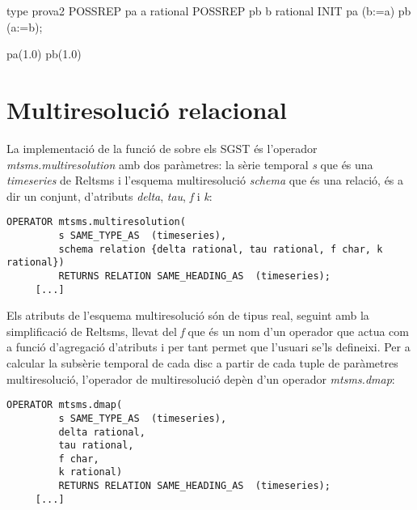 
type prova2 
  POSSREP pa {a rational}
  POSSREP pb {b rational}
  INIT pa (b:=a)
         pb (a:=b);

pa(1.0)
pb(1.0)







\section{Multiresolució relacional}


La implementació de la funció de 
sobre els \gls{SGST} és l'operador \emph{mtsms.multiresolution} amb
dos paràmetres: la sèrie temporal \emph{s} que és una
\emph{timeseries} de Reltsms i l'esquema multiresolució \emph{schema}
que és una relació, és a dir un conjunt, d'atributs \emph{delta},
\emph{tau}, \emph{f} i \emph{k}:

\begin{lstlisting}[style=tutorialD]
OPERATOR mtsms.multiresolution(
         s SAME_TYPE_AS  (timeseries),   
         schema relation {delta rational, tau rational, f char, k rational}) 
         RETURNS RELATION SAME_HEADING_AS  (timeseries);
     [...]
\end{lstlisting}
       



Els atributs de l'esquema multiresolució són de tipus real, seguint
amb la simplificació de Reltsms, llevat del \emph{f} que és un nom
d'un operador que actua com a funció d'agregació d'atributs i per tant
permet que l'usuari se'ls defineixi. Per a calcular la subsèrie
temporal de cada disc a partir de cada tuple de paràmetres
multiresolució, l'operador de multiresolució depèn d'un operador
\emph{mtsms.dmap}:
\begin{lstlisting}[style=tutorialD]
OPERATOR mtsms.dmap(
         s SAME_TYPE_AS  (timeseries),   
         delta rational, 
         tau rational,         
         f char,         
         k rational) 
         RETURNS RELATION SAME_HEADING_AS  (timeseries);
     [...]
\end{lstlisting}


